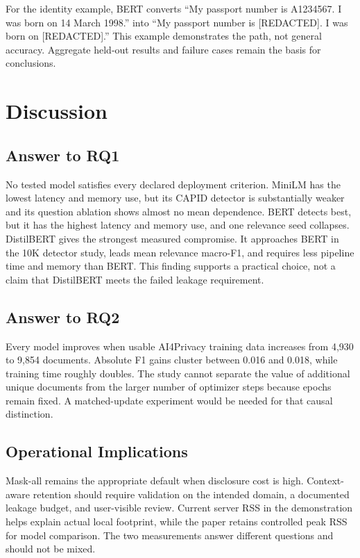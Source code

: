 \documentclass[conference]{IEEEtran}
\begin{document}
For the identity example, BERT converts ``My passport number is A1234567. I was born on 14 March 1998.'' into ``My passport number is [REDACTED]. I was born on [REDACTED].'' This example demonstrates the path, not general accuracy. Aggregate held-out results and failure cases remain the basis for conclusions.

\section{Discussion}
\subsection{Answer to RQ1}
No tested model satisfies every declared deployment criterion. MiniLM has the lowest latency and memory use, but its CAPID detector is substantially weaker and its question ablation shows almost no mean dependence. BERT detects best, but it has the highest latency and memory use, and one relevance seed collapses. DistilBERT gives the strongest measured compromise. It approaches BERT in the 10K detector study, leads mean relevance macro-F1, and requires less pipeline time and memory than BERT. This finding supports a practical choice, not a claim that DistilBERT meets the failed leakage requirement.

\subsection{Answer to RQ2}
Every model improves when usable AI4Privacy training data increases from 4,930 to 9,854 documents. Absolute F1 gains cluster between 0.016 and 0.018, while training time roughly doubles. The study cannot separate the value of additional unique documents from the larger number of optimizer steps because epochs remain fixed. A matched-update experiment would be needed for that causal distinction.

\subsection{Operational Implications}
Mask-all remains the appropriate default when disclosure cost is high. Context-aware retention should require validation on the intended domain, a documented leakage budget, and user-visible review. Current server RSS in the demonstration helps explain actual local footprint, while the paper retains controlled peak RSS for model comparison. The two measurements answer different questions and should not be mixed.
\end{document}
